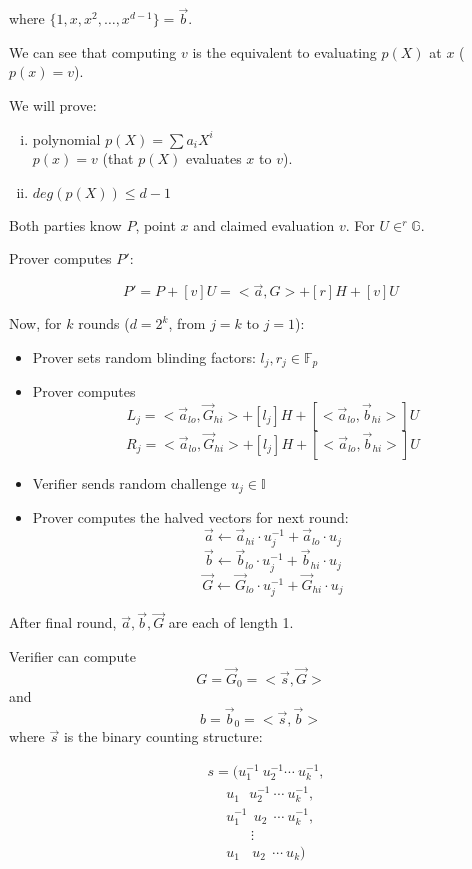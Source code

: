 \documentclass{article}
\theoremstyle{definition}
\begin{document}
where $\{1, x, x^2, \ldots, x^{d-1} \} = \overrightarrow{b}$.

We can see that computing $v$ is the equivalent to evaluating $p(X)$ at $x$ ($p(x)=v$).

We will prove:
\begin{enumerate}[i.]
    \item polynomial $p(X) = \sum a_i X^i$\\
	$p(x) = v$ (that $p(X)$ evaluates $x$ to $v$).
    \item $deg(p(X)) \leq d-1$
\end{enumerate}


Both parties know $P$, point $x$ and claimed evaluation $v$. For $U \in^r \mathbb{G}$.

Prover computes $P'$:

$$P' = P + [v] U = <\overrightarrow{a}, G> + [r]H + [v] U$$

Now, for $k$ rounds ($d=2^k$, from $j=k$ to $j=1$):
\begin{itemize}
    \item Prover sets random blinding factors: $l_j, r_j \in \mathbb{F}_p$
    \item Prover computes
	$$L_j = < \overrightarrow{a}_{lo}, \overrightarrow{G}_{hi}> + [l_j] H + [< \overrightarrow{a}_{lo}, \overrightarrow{b}_{hi}>] U$$
	$$R_j = < \overrightarrow{a}_{lo}, \overrightarrow{G}_{hi}> + [l_j] H + [< \overrightarrow{a}_{lo}, \overrightarrow{b}_{hi}>] U$$
    \item Verifier sends random challenge $u_j \in \mathbb{I}$
    \item Prover computes the halved vectors for next round:
	$$\overrightarrow{a} \leftarrow \overrightarrow{a}_{hi} \cdot u_j^{-1} + \overrightarrow{a}_{lo} \cdot u_j$$
	$$\overrightarrow{b} \leftarrow \overrightarrow{b}_{lo} \cdot u_j^{-1} + \overrightarrow{b}_{hi} \cdot u_j$$
	$$\overrightarrow{G} \leftarrow \overrightarrow{G}_{lo} \cdot u_j^{-1} + \overrightarrow{G}_{hi} \cdot u_j$$
\end{itemize}

After final round, $\overrightarrow{a}, \overrightarrow{b}, \overrightarrow{G}$ are each of length 1.

Verifier can compute
$$G = \overrightarrow{G}_0 = < \overrightarrow{s}, \overrightarrow{G} >$$
and $$b = \overrightarrow{b}_0 = < \overrightarrow{s}, \overrightarrow{b} >$$
where $\overrightarrow{s}$ is the binary counting structure:

\begin{align*}
    &s = (u_1^{-1} ~ u_2^{-1} \cdots ~u_k^{-1},\\
    &~~~~~~u_1 ~~~ u_2^{-1} ~\cdots ~u_k^{-1},\\
    &~~~~~~u_1^{-1} ~~ u_2 ~~\cdots ~u_k^{-1},\\
    &~~~~~~~~~~~~~~\vdots\\
    &~~~~~~u_1 ~~~~ u_2 ~~\cdots ~u_k)
\end{align*}
\end{document}
